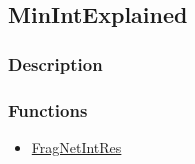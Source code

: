 \subsection{MinIntExplained}\label{MinIntExplained}
\subsubsection{Description}

\subsubsection{Functions}
\begin{itemize}
\item \hyperref[FragNetIntRes]{FragNetIntRes}
\end{itemize}

